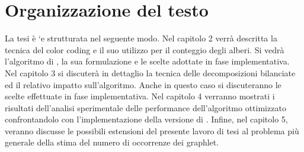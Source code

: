 \section{Organizzazione del testo}

La tesi è `e strutturata nel seguente modo.
Nel capitolo 2 verr\`a descritta la tecnica del color coding e il suo utilizzo per il conteggio degli alberi.
Si vedr\`a l'algoritmo di \cite{bressan2018motif}, la sua formulazione e le scelte adottate in fase implementativa.
Nel capitolo 3 si discuter\`a in dettaglio la tecnica delle decomposizioni bilanciate ed il relativo impatto sull'algoritmo. Anche in questo caso si discuteranno le scelte effettuate in fase implementativa.
Nel capitolo 4 verranno mostrati i risultati dell'analisi sperimentale delle performance dell'algoritmo ottimizzato confrontandolo con l'implementazione della versione di \cite{bressan2018motif}.
Infine, nel capitolo 5, veranno discusse le possibili estensioni del presente lavoro di tesi al problema più generale della stima del numero di occorrenze dei graphlet.

